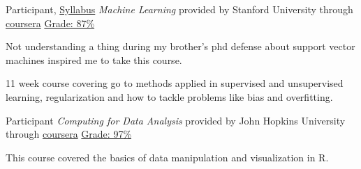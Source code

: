 

\begin{cventries}

\cventry
  {Participant, \href{https://www.coursera.org/learn/machine-learning\#syllabus}{Syllabus}} %
  {\textit{Machine Learning} provided by Stanford University through \href{https://www.coursera.org/learn/machine-learning}{coursera}}
  {\href{https://www.coursera.org/api/legacyCertificates.v1/spark/statementOfAccomplishment/971489~4383751/pdf}{Grade: 87\%}} %
  {} %
  {
    \begin{cvitems} %
      \item {Not understanding a thing during my brother's phd defense about support vector machines inspired me to take this course.}
      \item {11 week course covering go to methods applied in supervised and unsupervised learning, regularization and how to tackle problems like bias and overfitting.}
    \end{cvitems}
  }

\cventry
  {Participant} %
  {\textit{Computing for Data Analysis} provided by John Hopkins University through \href{https://www.coursera.org}{coursera}} %
  {\href{https://www.coursera.org/api/legacyCertificates.v1/spark/statementOfAccomplishment/970940~4383751/pdf}{Grade: 97\%}} %
  {} %
  {
    \begin{cvitems} %
      \item {This course covered the basics of data manipulation and visualization in R.}
    \end{cvitems}
  }


\end{cventries}
